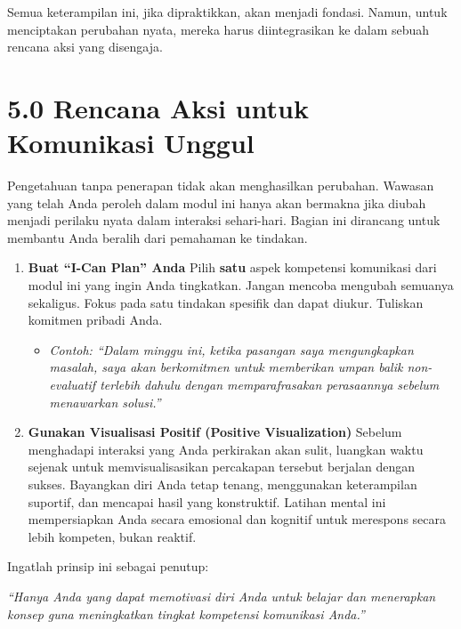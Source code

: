 \documentclass[
  letterpaper,
  DIV=11,
  numbers=noendperiod]{scrreprt}
\providecommand{\tightlist}{%
  \setlength{\itemsep}{0pt}\setlength{\parskip}{0pt}}
\begin{document}
Semua keterampilan ini, jika dipraktikkan, akan menjadi fondasi. Namun,
untuk menciptakan perubahan nyata, mereka harus diintegrasikan ke dalam
sebuah rencana aksi yang disengaja.

\section{\texorpdfstring{\textbf{5.0 Rencana Aksi untuk Komunikasi
Unggul}}{5.0 Rencana Aksi untuk Komunikasi Unggul}}\label{rencana-aksi-untuk-komunikasi-unggul}

Pengetahuan tanpa penerapan tidak akan menghasilkan perubahan. Wawasan
yang telah Anda peroleh dalam modul ini hanya akan bermakna jika diubah
menjadi perilaku nyata dalam interaksi sehari-hari. Bagian ini dirancang
untuk membantu Anda beralih dari pemahaman ke tindakan.

\begin{enumerate}
\def\labelenumi{\arabic{enumi}.}
\tightlist
\item
  \textbf{Buat ``I-Can Plan'' Anda} Pilih \textbf{satu} aspek kompetensi
  komunikasi dari modul ini yang ingin Anda tingkatkan. Jangan mencoba
  mengubah semuanya sekaligus. Fokus pada satu tindakan spesifik dan
  dapat diukur. Tuliskan komitmen pribadi Anda.

  \begin{itemize}
  \tightlist
  \item
    \emph{Contoh: ``Dalam minggu ini, ketika pasangan saya mengungkapkan
    masalah, saya akan berkomitmen untuk memberikan umpan balik
    non-evaluatif terlebih dahulu dengan memparafrasakan perasaannya
    sebelum menawarkan solusi.''}
  \end{itemize}
\item
  \textbf{Gunakan Visualisasi Positif (Positive Visualization)} Sebelum
  menghadapi interaksi yang Anda perkirakan akan sulit, luangkan waktu
  sejenak untuk memvisualisasikan percakapan tersebut berjalan dengan
  sukses. Bayangkan diri Anda tetap tenang, menggunakan keterampilan
  suportif, dan mencapai hasil yang konstruktif. Latihan mental ini
  mempersiapkan Anda secara emosional dan kognitif untuk merespons
  secara lebih kompeten, bukan reaktif.
\end{enumerate}

Ingatlah prinsip ini sebagai penutup:

\emph{``Hanya Anda yang dapat memotivasi diri Anda untuk belajar dan
menerapkan konsep guna meningkatkan tingkat kompetensi komunikasi
Anda.''}
\end{document}
